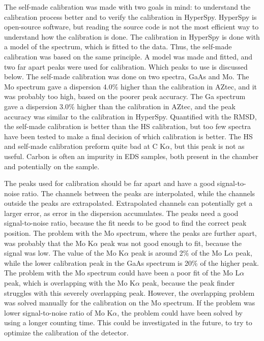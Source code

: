 The self-made calibration was made with two goals in mind: to understand the calibration process better and to verify the calibration in HyperSpy.
HyperSpy is open-source software, but reading the source code is not the most efficient way to understand how the calibration is done.
The calibration in HyperSpy is done with a model of the spectrum, which is fitted to the data.
Thus, the self-made calibration was based on the same principle.
A model was made and fitted, and two far apart peaks were used for calibration.
Which peaks to use is discussed below.
The self-made calibration was done on two spectra, GaAs and Mo.
The Mo spectrum gave a dispersion 4.0\% higher than the calibration in AZtec, and it was probably too high, based on the poorer peak accuracy.
The Ga spectrum gave a dispersion 3.0\% higher than the calibration in AZtec, and the peak accuracy was similar to the calibration in HyperSpy.
Quantified with the RMSD, the self-made calibration is better than the HS calibration, but too few spectra have been tested to make a final decision of which calibration is better.
The HS and self-made calibration preform quite bad at C K$\alpha$, but this peak is not as useful.
Carbon is often an impurity in EDS samples, both present in the chamber and potentially on the sample.

The peaks used for calibration should be far apart and have a good signal-to-noise ratio.
The channels between the peaks are interpolated, while the channels outside the peaks are extrapolated.
Extrapolated channels can potentially get a larger error, as error in the dispersion accumulates.
The peaks need a good signal-to-noise ratio, because the fit needs to be good to find the correct peak position.
The problem with the Mo spectrum, where the peaks are further apart, was probably that the Mo K$\alpha$ peak was not good enough to fit, because the signal was low.
The value of the Mo K$\alpha$ peak is around 2\% of the Mo L$\alpha$ peak, while the lower calibration peak in the GaAs spectrum is 20\% of the higher peak.
The problem with the Mo spectrum could have been a poor fit of the Mo L$\alpha$ peak, which is overlapping with the Mo K$\alpha$ peak, because the peak finder struggles with this severely overlapping peak.
However, the overlapping problem was solved manually for the calibration on the Mo spectrum.
If the problem was lower signal-to-noise ratio of Mo K$\alpha$, the problem could have been solved by using a longer counting time.
This could be investigated in the future, to try to optimize the calibration of the detector.


